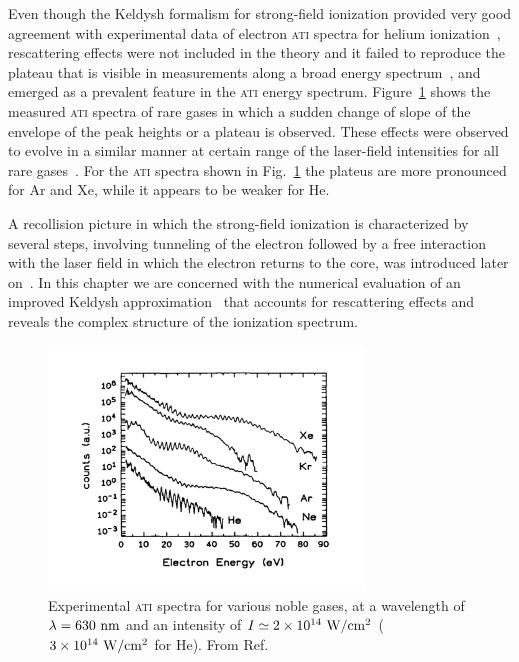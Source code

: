 Even though the Keldysh formalism for strong-field ionization provided
very good agreement with experimental data of electron \textsc{ati}
spectra for helium ionization~\cite{Walker_1994exp}, rescattering
effects were not included in the theory and it failed to reproduce the
plateau that is visible in measurements along a broad energy
spectrum~\cite{Paulus_1994plateau, Walker_1996}, and emerged as a
prevalent feature in the \textsc{ati} energy
spectrum. Figure~\ref{fig:plateau_ATI} shows the measured \textsc{ati}
spectra of rare gases in which a sudden change of slope of the
envelope of the peak heights or a plateau is observed. These effects
were observed to evolve in a similar manner at certain range of the
laser-field intensities for all rare
gases~\cite{Paulus_1994plateau}. For the \textsc{ati} spectra shown in
Fig.~\ref{fig:plateau_ATI} the plateus are more pronounced for Ar and
Xe, while it appears to be weaker for He.

A recollision picture in which the strong-field ionization is
characterized by several steps, involving tunneling of the electron
followed by a free interaction with the laser field in which the
electron returns to the core, was introduced later
on~\cite{Corkum_1993, LewensteinSPA_1994}. In this chapter we are
concerned with the numerical evaluation of an improved Keldysh
approximation~\cite{Kopold_1997sfa} that accounts for rescattering
effects and reveals the complex structure of the ionization spectrum.

\begin{figure}
  \centering
  \includegraphics[width=0.75\textwidth]{figures/ch_ATI_SFA/plateauPRL72}
  \caption{Experimental \textsc{ati} spectra for various noble gases,
    at a wavelength of $\lambda = 630\ \rm{nm}$ and an intensity of $I
    \simeq 2\times 10^{14}\ \rm{W/cm^{2}}$ ($3\times
    10^{14}\ \rm{W/cm^{2}}$ for He). From
    Ref.~\cite{Paulus_1994plateau}}
  \label{fig:plateau_ATI}
\end{figure}

